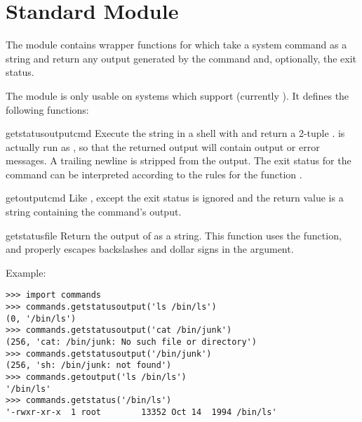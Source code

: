 
\section{Standard Module }



The  module contains wrapper functions for
 which take a system command as a string and
return any output generated by the command and, optionally, the exit
status.

The  module is only usable on systems which support 
 (currently \UNIX{}).  It defines the following
functions:


\begin{funcdesc}{getstatusoutput}{cmd}
Execute the string  in a shell with  and
return a 2-tuple .   is
actually run as , so that the returned
output will contain output or error messages. A trailing newline is
stripped from the output. The exit status for the command can be
interpreted according to the rules for the \C{} function
.
\end{funcdesc}

\begin{funcdesc}{getoutput}{cmd}
Like , except the exit status is ignored
and the return value is a string containing the command's output.  
\end{funcdesc}

\begin{funcdesc}{getstatus}{file}
Return the output of  as a string.  This
function uses the  function, and properly
escapes backslashes and dollar signs in the argument.
\end{funcdesc}

Example:

\begin{verbatim}
>>> import commands
>>> commands.getstatusoutput('ls /bin/ls')
(0, '/bin/ls')
>>> commands.getstatusoutput('cat /bin/junk')
(256, 'cat: /bin/junk: No such file or directory')
>>> commands.getstatusoutput('/bin/junk')
(256, 'sh: /bin/junk: not found')
>>> commands.getoutput('ls /bin/ls')
'/bin/ls'
>>> commands.getstatus('/bin/ls')
'-rwxr-xr-x  1 root        13352 Oct 14  1994 /bin/ls'
\end{verbatim}
